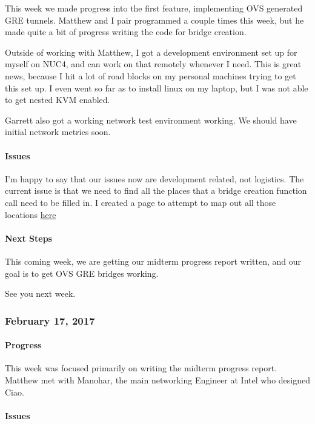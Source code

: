 \documentclass[10pt,onecolumn,journal,draftclsnofoot]{IEEEtran}
\begin{document}
This week we made progress into the first feature, implementing OVS
generated GRE tunnels. Matthew and I pair programmed a couple times this
week, but he made quite a bit of progress writing the code for bridge
creation.

Outside of working with Matthew, I got a development environment set up
for myself on NUC4, and can work on that remotely whenever I need. This
is great news, because I hit a lot of road blocks on my personal
machines trying to get this set up. I even went so far as to install
linux on my laptop, but I was not able to get nested KVM enabled.

Garrett also got a working network test environment working. We should
have initial network metrics soon.

\paragraph{Issues} 

I'm happy to say that our issues now are development related, not
logistics. The current issue is that we need to find all the places that
a bridge creation function call need to be filled in. I created a page
to attempt to map out all those locations
\href{https://github.com/codymalick/CapstoneDocs/wiki/GRE-Function-Call-Hierarchy}{here}

\paragraph{Next Steps} 

This coming week, we are getting our midterm progress report written,
and our goal is to get OVS GRE bridges working.

See you next week.

\subsubsection{February 17, 2017} 

\paragraph{Progress} 

This week was focused primarily on writing the midterm progress report.
Matthew met with Manohar, the main networking Engineer at Intel who
designed Ciao.

\paragraph{Issues} 
\end{document}
